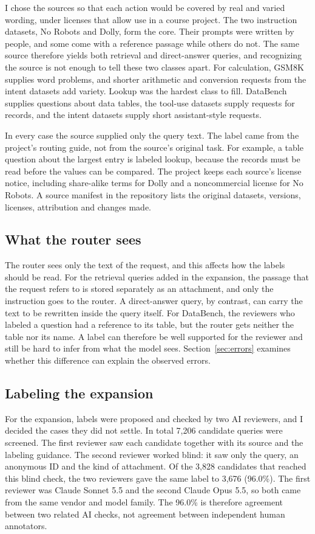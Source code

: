 \documentclass[conference]{IEEEtran}
\begin{document}
I chose the sources so that each action would be covered by real and varied wording, under licenses that allow use in a course project. The two instruction datasets, No Robots and Dolly, form the core. Their prompts were written by people, and some come with a reference passage while others do not. The same source therefore yields both retrieval and direct-answer queries, and recognizing the source is not enough to tell these two classes apart. For calculation, GSM8K supplies word problems, and shorter arithmetic and conversion requests from the intent datasets add variety. Lookup was the hardest class to fill. DataBench supplies questions about data tables, the tool-use datasets supply requests for records, and the intent datasets supply short assistant-style requests.

In every case the source supplied only the query text. The label came from the project's routing guide, not from the source's original task. For example, a table question about the largest entry is labeled lookup, because the records must be read before the values can be compared. The project keeps each source's license notice, including share-alike terms for Dolly and a noncommercial license for No Robots. A source manifest in the repository lists the original datasets, versions, licenses, attribution and changes made.

\subsection{What the router sees}
The router sees only the text of the request, and this affects how the labels should be read. For the retrieval queries added in the expansion, the passage that the request refers to is stored separately as an attachment, and only the instruction goes to the router. A direct-answer query, by contrast, can carry the text to be rewritten inside the query itself. For DataBench, the reviewers who labeled a question had a reference to its table, but the router gets neither the table nor its name. A label can therefore be well supported for the reviewer and still be hard to infer from what the model sees. Section~\ref{sec:errors} examines whether this difference can explain the observed errors.

\subsection{Labeling the expansion}
For the expansion, labels were proposed and checked by two AI reviewers, and I decided the cases they did not settle. In total 7,206 candidate queries were screened. The first reviewer saw each candidate together with its source and the labeling guidance. The second reviewer worked blind: it saw only the query, an anonymous ID and the kind of attachment. Of the 3,828 candidates that reached this blind check, the two reviewers gave the same label to 3,676 (96.0\%). The first reviewer was Claude Sonnet 5.5 and the second Claude Opus 5.5, so both came from the same vendor and model family. The 96.0\% is therefore agreement between two related AI checks, not agreement between independent human annotators.
\end{document}
